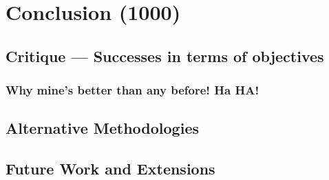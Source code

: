 \chapter{Conclusion (1000)}
\section{Critique --- Successes in terms of objectives}
\subsection{Why mine's better than any before! Ha HA!}
\section{Alternative Methodologies}
\section{Future Work and Extensions}

